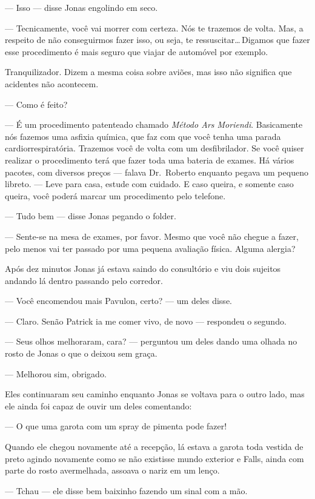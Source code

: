 --- Isso --- disse Jonas engolindo em seco.

--- Tecnicamente, você vai morrer com certeza. Nós te trazemos de volta. Mas, a respeito de não conseguirmos fazer isso, ou seja, te ressuscitar\ldots\,Digamos que fazer esse procedimento é mais seguro que viajar de automóvel por exemplo.

Tranquilizador. Dizem a mesma coisa sobre aviões, mas isso não significa que acidentes não acontecem.

--- Como é feito?

--- É um procedimento patenteado chamado \emph{Método Ars Moriendi}. Basicamente nós fazemos uma asfixia química, que faz com que você tenha uma parada cardiorrespiratória. Trazemos você de volta com um desfibrilador. Se você quiser realizar o procedimento terá que fazer toda uma bateria de exames. Há vários pacotes, com diversos preços --- falava Dr.~Roberto enquanto pegava um pequeno libreto. --- Leve para casa, estude com cuidado. E caso queira, e somente caso queira, você poderá marcar um procedimento pelo telefone.

--- Tudo bem --- disse Jonas pegando o folder.

--- Sente-se na mesa de exames, por favor. Mesmo que você não chegue a fazer, pelo menos vai ter passado por uma pequena avaliação física. Alguma alergia?

Após dez minutos Jonas já estava saindo do consultório e viu dois sujeitos andando lá dentro passando pelo corredor.

--- Você encomendou mais Pavulon, certo? --- um deles disse.

--- Claro. Senão Patrick ia me comer vivo, de novo --- respondeu o segundo.

--- Seus olhos melhoraram, cara? --- perguntou um deles dando uma olhada no rosto de Jonas o que o deixou sem graça.

--- Melhorou sim, obrigado.

Eles continuaram seu caminho enquanto Jonas se voltava para o outro lado, mas ele ainda foi capaz de ouvir um deles comentando:

--- O que uma garota com um spray de pimenta pode fazer!

Quando ele chegou novamente até a recepção, lá estava a garota toda vestida de preto agindo novamente como se não existisse mundo exterior e Falls, ainda com parte do rosto avermelhada, assoava o nariz em um lenço.

--- Tchau --- ele disse bem baixinho\mudanca{,} fazendo um sinal com a mão.

